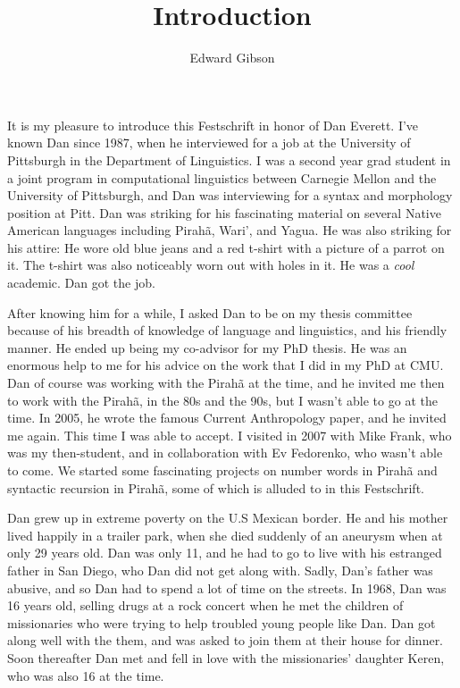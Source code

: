 \documentclass[output=paper,biblatex,babelshorthands,newtxmath,draftmode,colorlinks,citecolor=brown]{langscibook}
\author{Edward Gibson\orcid{}\affiliation{MIT} }
\title{Introduction} %
\begin{document}
\maketitle

It is my pleasure to introduce this Festschrift in honor of Dan Everett. I've known Dan since 1987, when he interviewed for a job at the University of Pittsburgh in the Department of Linguistics. I was a second year grad student in a joint program in computational linguistics between Carnegie Mellon and the University of Pittsburgh, and Dan was interviewing for a syntax and morphology position at Pitt. Dan was striking for his fascinating material on several Native American languages including Pirahã, Wari', and Yagua. He was also striking for his attire: He wore old blue jeans and a red t-shirt with a picture of a parrot on it.  The t-shirt was also noticeably worn out with holes in it. He was a \textit{cool} academic. Dan got the job. 

After knowing him for a while, I asked Dan to be on my thesis committee because of his breadth of knowledge of language and linguistics, and his friendly manner. He ended up being my co-advisor for my PhD thesis. He was an enormous help to me for his advice on the work that I did in my PhD at CMU. Dan of course was working with the Pirahã at the time, and he invited me then to work with the Pirahã, in the 80s and the 90s, but I wasn't able to go at the time. In 2005, he wrote the famous Current Anthropology paper, and he invited me again. This time I was able to accept. I visited in 2007 with Mike Frank, who was my then-student, and in collaboration with Ev Fedorenko, who wasn't able to come. We started some fascinating projects on number words in Pirahã and syntactic recursion in Pirahã, some of which is alluded to in this Festschrift. 

Dan grew up in extreme poverty on the U.S Mexican border. He and his mother lived happily in a trailer park, when she died suddenly of an aneurysm when at only 29 years old. Dan was only 11, and he had to go to live with his estranged father in San Diego, who Dan did not get along with. Sadly, Dan's father was abusive, and so Dan had to spend a lot of time on the streets. In 1968, Dan was 16 years old, selling drugs at a rock concert when he met the children of missionaries who were trying to help troubled young people like Dan. Dan got along well with the them, and was asked to join them at their house for dinner. Soon thereafter Dan met and fell in love with the missionaries' daughter Keren, who was also 16 at the time.
\end{document}
